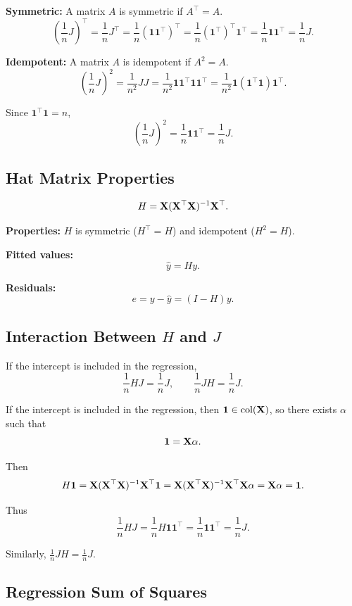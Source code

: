 \textbf{Symmetric:} A matrix $A$ is symmetric if $A^\top=A$.
\[
\left(\frac{1}{n}J\right)^\top
=\frac{1}{n}J^\top
=\frac{1}{n}(\mathbf{1}\mathbf{1}^\top)^\top
=\frac{1}{n}(\mathbf{1}^\top)^\top \mathbf{1}^\top
=\frac{1}{n}\mathbf{1}\mathbf{1}^\top
=\frac{1}{n}J.
\]

\textbf{Idempotent:} A matrix $A$ is idempotent if $A^2=A$.
\[
\left(\frac{1}{n}J\right)^2
=\frac{1}{n^2}JJ
=\frac{1}{n^2}\mathbf{1}\mathbf{1}^\top\mathbf{1}\mathbf{1}^\top
=\frac{1}{n^2}\mathbf{1}(\mathbf{1}^\top\mathbf{1})\mathbf{1}^\top.
\]

Since $\mathbf{1}^\top\mathbf{1}=n$,
\[
\left(\frac{1}{n}J\right)^2
=\frac{1}{n}\mathbf{1}\mathbf{1}^\top
=\frac{1}{n}J.
\]

\subsection{Hat Matrix Properties}

\[
H = \mathbf{X}(\mathbf{X}^\top \mathbf{X})^{-1}\mathbf{X}^\top.
\]

\textbf{Properties:} $H$ is symmetric ($H^\top=H$) and idempotent ($H^2=H$).

\textbf{Fitted values:}
\[
\hat{y} = Hy.
\]

\textbf{Residuals:}
\[
e = y-\hat{y} = (I-H)y.
\]

\subsection{Interaction Between $H$ and $J$}

\begin{keyresult}
If the intercept is included in the regression,
\[
\frac{1}{n}HJ=\frac{1}{n}J, \qquad
\frac{1}{n}JH=\frac{1}{n}J.
\]
\end{keyresult}

If the intercept is included in the regression, then $\mathbf{1}\in\text{col}(\mathbf{X})$, so there exists $\alpha$ such that
\[
\mathbf{1}=\mathbf{X}\alpha.
\]

Then
\[
H\mathbf{1}
= \mathbf{X}(\mathbf{X}^\top \mathbf{X})^{-1}\mathbf{X}^\top\mathbf{1}
= \mathbf{X}(\mathbf{X}^\top \mathbf{X})^{-1}\mathbf{X}^\top \mathbf{X}\alpha
= \mathbf{X}\alpha
= \mathbf{1}.
\]

Thus
\[
\frac{1}{n}HJ
=\frac{1}{n}H\mathbf{1}\mathbf{1}^\top
=\frac{1}{n}\mathbf{1}\mathbf{1}^\top
=\frac{1}{n}J.
\]

Similarly, $\frac{1}{n}JH=\frac{1}{n}J$.

\subsection{Regression Sum of Squares}

